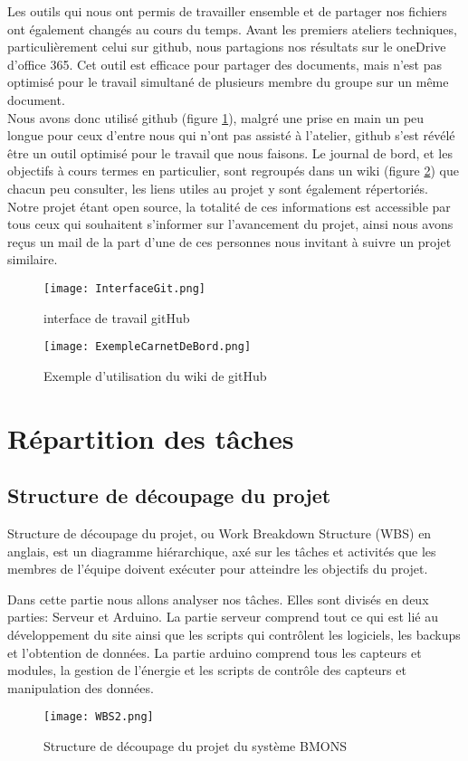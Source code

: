 Les outils qui nous ont permis de travailler ensemble et de partager nos fichiers ont également changés au cours du temps. 
Avant les premiers ateliers techniques, particulièrement celui sur github, nous partagions nos résultats sur le oneDrive d'office 365. Cet outil est efficace pour partager des documents, mais n'est pas optimisé pour le travail simultané de plusieurs membre du groupe sur un même document. \\
Nous avons donc utilisé github (figure \ref{fig:InterfaceGit}), malgré une prise en main un peu longue pour ceux d'entre nous qui n'ont pas assisté à l'atelier, github s'est révélé être un outil optimisé pour le travail que nous faisons. Le journal de bord, et les objectifs à cours termes en particulier, sont regroupés dans un wiki (figure \ref{fig:ExempleWiki}) que chacun peu consulter, les liens utiles au projet y sont également répertoriés. Notre projet étant open source, la totalité de ces informations est accessible par tous ceux qui souhaitent s'informer sur l'avancement du projet, ainsi nous avons reçus un mail de la part d'une de ces personnes nous invitant à suivre un projet similaire.

\begin{figure}[h!]
\centering\texttt{[image: InterfaceGit.png]}
\caption{\label{fig:InterfaceGit} interface de travail gitHub}
\end{figure}

\begin{figure}[h!]
\centering\texttt{[image: ExempleCarnetDeBord.png]}
\caption{\label{fig:ExempleWiki} Exemple d'utilisation du wiki de gitHub}
\end{figure}

\chapter{Répartition des tâches}

\section{Structure de découpage du projet}
\vspace{1.0cm}
Structure de découpage du projet, ou Work Breakdown Structure (WBS) en anglais, est un diagramme hiérarchique, axé sur les tâches et activités que les membres de l'équipe doivent exécuter pour atteindre les objectifs du projet.

Dans cette partie nous allons analyser nos tâches. Elles sont divisés en deux parties: Serveur et Arduino. La partie serveur comprend tout ce qui est lié au développement du site ainsi que les scripts qui contrôlent les logiciels, les backups et l'obtention de données. La partie arduino comprend tous les capteurs et modules, la gestion de l'énergie et les scripts de contrôle des capteurs et manipulation des données.  
\begin{figure}[h!]
\centering\texttt{[image: WBS2.png]}
\caption{\label{fig:SDP} Structure de découpage du projet du système BMONS}
\end{figure}


